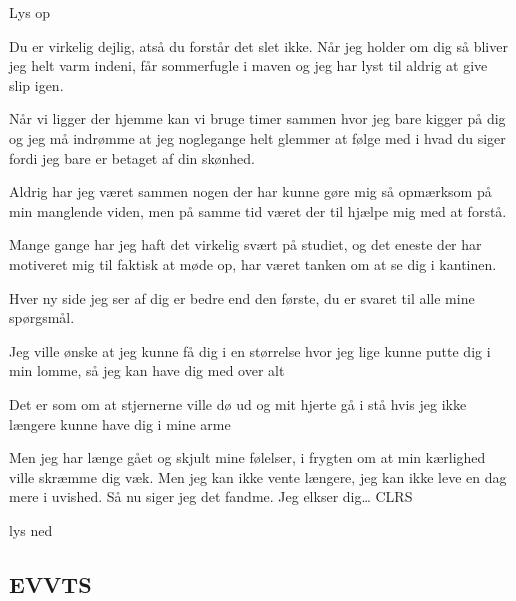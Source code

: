\documentclass{article}
\begin{document}
\newpage%
\begin{sketch}

\scene Lys op



Du er virkelig dejlig, atså du forstår det slet ikke. Når jeg holder om dig så bliver jeg helt varm indeni, får sommerfugle i maven og jeg har lyst til aldrig at give slip igen. 

Når vi ligger der hjemme kan vi bruge timer sammen hvor jeg bare kigger på dig og jeg må indrømme at jeg noglegange helt glemmer at følge med i hvad du siger fordi jeg bare er betaget af din skønhed. 

Aldrig har jeg været sammen nogen der har kunne gøre mig så opmærksom på min manglende viden, men på samme tid været der til hjælpe mig med at forstå. 


Mange gange har jeg haft det virkelig svært på studiet, og det eneste der har motiveret mig til faktisk at møde op, har været tanken om at se dig i kantinen.

 Hver ny side jeg ser af dig er bedre end den første, du er svaret til alle mine spørgsmål.

Jeg ville ønske at jeg kunne få dig i en størrelse hvor jeg lige kunne putte dig i min lomme, så jeg kan have dig med over alt

 Det er som om at stjernerne ville dø ud og mit hjerte gå i stå hvis jeg ikke længere kunne have dig i mine arme





Men jeg har længe gået og skjult mine følelser, i frygten om at min kærlighed ville skræmme dig væk. Men jeg kan ikke vente længere, jeg kan ikke leve en dag mere i uvished. Så nu siger jeg det fandme. Jeg elkser dig… CLRS

\scene lys ned



\newpage

\subsection{EVVTS}


\end{sketch}
\end{document}
